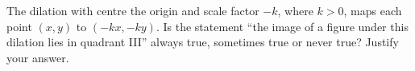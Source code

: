 The dilation with centre the origin and scale factor $-k$, where $k>0$, maps each point $(x,y)$ to $(-kx,-ky)$. Is the statement ``the image of a figure under this dilation lies in quadrant III'' always true, sometimes true or never true? Justify your answer.
